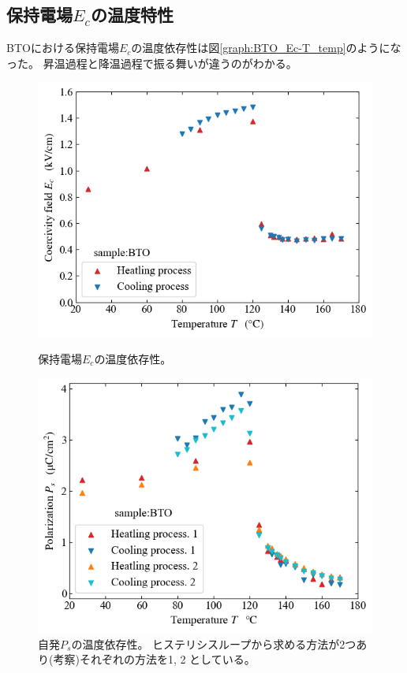 \documentclass[11pt,dvipdfmx,a4paper]{jsarticle}
\begin{document}
\subsection{保持電場\(E_c\)の温度特性}
BTOにおける保持電場\(E_c\)の温度依存性は図\ref{graph:BTO_Ec-T_temp}のようになった。
昇温過程と降温過程で振る舞いが違うのがわかる。
\begin{figure}[H]
    \begin{minipage}[t]{0.48\columnwidth}
        \centering
        \includegraphics[width=\columnwidth]{BTO_Ec-T.png}
        \caption{\small{保持電場\(E_c\)の温度依存性。}}
        \label{graph:BTO_Ec-T_temp}
    \end{minipage}
    \hfill
    \begin{minipage}[t]{0.48\columnwidth}
        \centering
        \includegraphics[width=\columnwidth]{BTO_Ps-T.png}
        \caption{\small{自発\(P_s\)の温度依存性。
        ヒステリシスループから求める方法が2つあり(考察)それぞれの方法を1, 2 としている。}}
        \label{graph:BTO_Ps-T}
    \end{minipage}
\end{figure}
\end{document}
